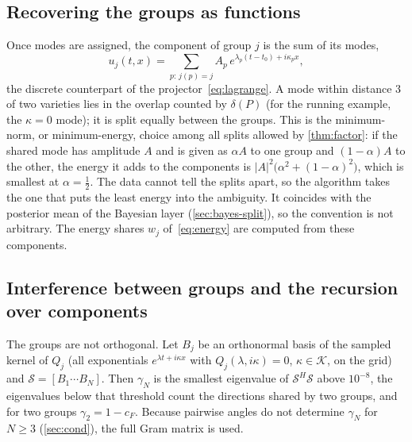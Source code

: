 \documentclass[11pt]{article}
\theoremstyle{plain}
\theoremstyle{definition}
\theoremstyle{remark}
\newcommand{\sumop}{\mathcal{S}}            %
\newcommand{\cF}{c_{F}}                     %
\newcommand{\gN}{\gamma_{N}}                %
\newcommand{\deltaP}{\delta(P)}             %
\newcommand{\abs}[1]{\lvert#1\rvert}
\begin{document}


\subsection{Recovering the groups as functions}\label{sec:alg-components}
Once modes are assigned, the component of group $j$ is the sum of its modes,
\begin{equation}\label{eq:uj}
  u_j(t,x)=\sum_{p:\,j(p)=j}A_p\,e^{\lambda_p(t-t_0)+i\kappa_px},
\end{equation}
the discrete counterpart of the projector~\eqref{eq:lagrange}. A mode within distance $3$ of two
varieties lies in the overlap counted by $\deltaP$ (for the running example, the $\kappa=0$ mode); it is
split equally between the groups. This is the minimum-norm, or minimum-energy, choice among all splits allowed by
\cref{thm:factor}: if the shared mode has amplitude $A$ and is given as $\alpha A$ to one group and $(1-\alpha)A$ to the
other, the energy it adds to the components is $\abs{A}^2\big(\alpha^2+(1-\alpha)^2\big)$, which is smallest at
$\alpha=\tfrac12$. The data cannot tell the splits apart, so the algorithm takes the one that puts the least energy
into the ambiguity. It coincides with the posterior mean of the Bayesian layer (\cref{sec:bayes-split}), so the
convention is not arbitrary. The energy shares $w_j$ of~\eqref{eq:energy}
are computed from these components.

\subsection{Interference between groups and the recursion over components}\label{sec:alg-interference}
The groups are not orthogonal. Let $B_j$ be an orthonormal basis of the sampled kernel of $Q_j$ (all
exponentials $e^{\lambda t+i\kappa x}$ with $Q_j(\lambda,i\kappa)=0$, $\kappa\in\mathcal K$, on the grid) and
$\sumop=[B_1\cdots B_N]$. Then $\gN$ is the smallest eigenvalue of $\sumop^H\sumop$ above $10^{-8}$, the
eigenvalues below that threshold count the directions shared by two groups, and for two groups
$\gamma_2=1-\cF$. Because pairwise angles do not determine $\gN$ for $N\ge3$ (\cref{sec:cond}), the full
Gram matrix is used.
\end{document}
